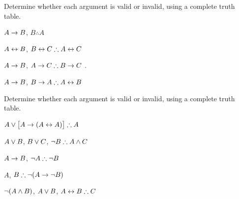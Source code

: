\noindent\problempart
\label{pr.TT.valid2}
Determine whether each argument is valid or invalid, using a complete truth table.
\begin{compactlist}
\item $A\rightarrow B$, $B \therefore  A$ \hfill {}

\item $A\leftrightarrow B$, $B\leftrightarrow C \therefore A\leftrightarrow C$ \hfill {}

\item $A \rightarrow B$, $A \rightarrow C\therefore B \rightarrow C$ \hfill {}.

\item $A \rightarrow B$, $B \rightarrow A\therefore A \leftrightarrow B$ \hfill {} 
\end{compactlist}

\noindent\problempart
\label{pr.TT.valid3}
Determine whether each argument is valid or invalid, using a complete truth table.
\begin{compactlist}
\item $A\vee\bigl[A\rightarrow(A\leftrightarrow A)\bigr] \therefore  A $\vspace{.5ex} \hfill {}
\item $A\vee B$, $B\vee C$, $\neg B \therefore A \wedge C$\vspace{.5ex} \hfill {}
\item $A \rightarrow B$, $\neg A\therefore \neg B$ \vspace{.5ex} \hfill {}
\item $A$, $B\therefore \neg(A\rightarrow \neg B)$ \vspace{.5ex} \hfill {}
\item $\neg(A \wedge B)$, $A \vee B$, $A \leftrightarrow B\therefore C$ \vspace{.5ex} \hfill {}
\end{compactlist}

